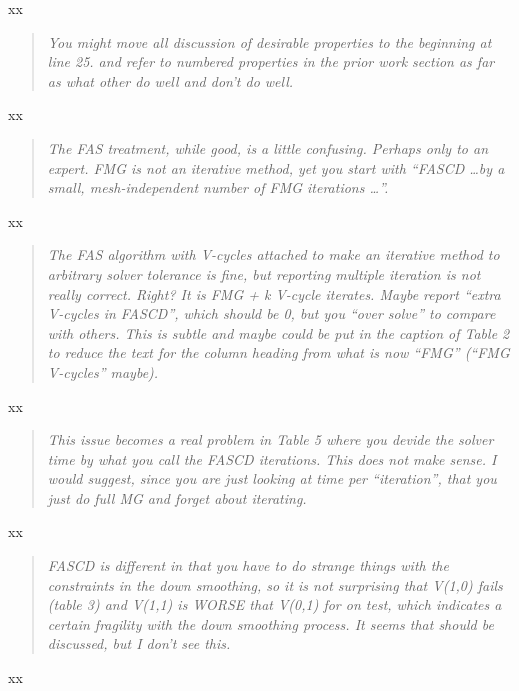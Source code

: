 \documentclass[letterpaper,final,12pt,reqno]{amsart}
\newenvironment{review}%
{\bigskip \par \begin{quote} \selectfont \sl}%
{\end{quote}}
\begin{document}
\noindent xx

\begin{review}
You might move all discussion of desirable properties to the beginning at line 25. and refer to numbered properties in the prior work section as far as what other do well and don't do well.
\end{review}

\noindent xx

\begin{review}
The FAS treatment, while good, is a little confusing.  Perhaps only to an expert. FMG is not an iterative method, yet you start with ``FASCD \dots by a small, mesh-independent number of FMG iterations \dots''.
\end{review}

\noindent xx

\begin{review}
The FAS algorithm with V-cycles attached to make an iterative method to arbitrary solver tolerance is fine, but reporting multiple iteration is not really correct.  Right?  It is FMG + k V-cycle iterates.  Maybe report ``extra V-cycles in FASCD'', which should be 0, but you ``over solve'' to compare with others.  This is subtle and maybe could be put in the caption of Table 2 to reduce the text for the column heading from what is now ``FMG'' (``FMG V-cycles'' maybe).
\end{review}

\noindent xx


\begin{review}
This issue becomes a real problem in Table 5 where you devide the solver time by what you call the FASCD iterations.  This does not make sense. I would suggest, since you are just looking at time per ``iteration'', that you just do full MG and forget about iterating.
\end{review}

\noindent xx

\begin{review}
FASCD is different in that you have to do strange things with the constraints in the down smoothing, so it is not surprising that V(1,0) fails (table 3) and V(1,1) is WORSE that V(0,1) for on test, which indicates a certain fragility with the down smoothing process. It seems that should be discussed, but I don't see this.
\end{review}

\noindent xx
\end{document}
